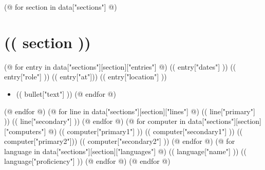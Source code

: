 \documentclass[11pt,color,letterpaper,sans]{moderncv}
\begin{document}
\maketitle

(@ for section in data["sections"] @)
  \section{(( section ))}
  (@ for entry in data["sections"][section]["entries"] @)
    \cventry
      {(( entry["dates"] ))}
      {(( entry["role"] ))}
      {(( entry["at"])) }
      {(( entry["location"] ))}
      {}
      {
        \begin{itemize}
        (@ for bullet in entry["bullets"] @) \item (( bullet["text"] )) (@ endfor @)
        \end{itemize}
      }
  (@ endfor @)
  (@ for line in data["sections"][section]["lines"] @)
    \cvline
      {(( line["primary"] ))}
      {(( line["secondary"] ))}
  (@ endfor @)
  (@ for computer in data["sections"][section]["computers"] @)
    \cvcomputer
      {(( computer["primary1"] ))}
      {(( computer["secondary1"] ))}
      {(( computer["primary2"])) }
      {(( computer["secondary2"] ))}
  (@ endfor @)
  (@ for language in data["sections"][section]["languages"] @)
    \cvlanguage
      {(( language["name"] ))}
      {(( language["proficiency"] ))}
      {}
  (@ endfor @)
(@ endfor @)
\end{document}
